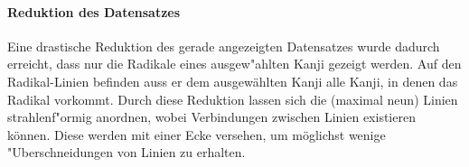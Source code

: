 \paragraph{Reduktion des Datensatzes}
Eine drastische Reduktion des gerade angezeigten Datensatzes wurde dadurch erreicht, dass nur die Radikale eines ausgew"ahlten Kanji gezeigt werden. Auf den Radikal-Linien befinden auss er dem ausgewählten Kanji alle Kanji, in denen das Radikal vorkommt. Durch diese Reduktion lassen sich die (maximal neun) Linien strahlenf"ormig anordnen, wobei Verbindungen zwischen Linien existieren können. Diese werden mit einer Ecke versehen, um möglichst wenige "Uberschneidungen von Linien zu erhalten. 
